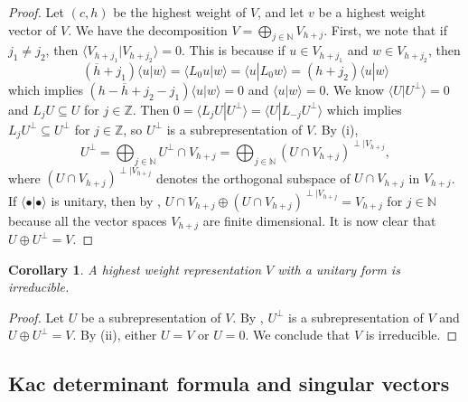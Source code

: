 \documentclass[a4paper, 12pt, reqno]{amsart}
\newtheorem{corollary}[theorem]{Corollary}
\theoremstyle{remark}
\begin{document}
\begin{proof}
  Let $(c, h)$ be the highest weight of $V$, and let $v$ be a highest weight vector of $V$.
  We have the decomposition $V = \bigoplus_{j \in \mathbb{N}}V_{h + j}$.
  First, we note that if $j_1 \neq j_2$, then $\langle V_{h + j_1}| V_{h + j_2}\rangle = 0$.
  This is because if $u \in V_{h + j_1}$ and $w \in V_{h + j_2}$, then
  \begin{equation*}
    (\overline{h} + j_1)\langle u| w\rangle = \langle L_0u| w\rangle = \langle u| L_0w\rangle = (h + j_2)\langle u| w\rangle
  \end{equation*}
  which implies $(h - \overline{h} + j_2 - j_1)\langle u| w\rangle = 0$ and $\langle u| w\rangle = 0$.
  We know $\langle U| U^{\perp}\rangle = 0$ and $L_jU \subseteq U$ for $j \in \mathbb{Z}$.
  Then $0 = \langle L_jU| U^{\perp}\rangle = \langle U| L_{-j}U^{\perp}\rangle$ which implies $L_jU^{\perp} \subseteq U^{\perp}$ for $j \in \mathbb{Z}$, so $U^{\perp}$ is a subrepresentation of $V$.
  By (i),
  \begin{equation*}
    U^{\perp} = \bigoplus_{j \in \mathbb{N}}U^{\perp} \cap V_{h + j} = \bigoplus_{j \in \mathbb{N}}(U \cap V_{h + j})^{\perp|V_{h + j}},
  \end{equation*}
  where $(U \cap V_{h + j})^{\perp|V_{h + j}}$ denotes the orthogonal subspace of $U \cap V_{h + j}$ in $V_{h + j}$.
  If $\langle\bullet| \bullet\rangle$ is unitary, then by , $U \cap V_{h + j} \oplus (U \cap V_{h + j})^{\perp|V_{h + j}} = V_{h + j}$ for $j \in \mathbb{N}$ because all the vector spaces $V_{h + j}$ are finite dimensional.
  It is now clear that $U \oplus U^{\perp} = V$.
\end{proof}

\begin{corollary}
  \label{crl:2}
  A highest weight representation $V$ with a unitary form is irreducible.
\end{corollary}

\begin{proof}
  Let $U$ be a subrepresentation of $V$.
  By , $U^{\perp}$ is a subrepresentation of $V$ and $U \oplus U^{\perp} = V$.
  By (ii), either $U = V$ or $U = 0$.
  We conclude that $V$ is irreducible.
\end{proof}

\subsection{Kac determinant formula and singular vectors}
\label{sec:kac-dete-form}
\end{document}
